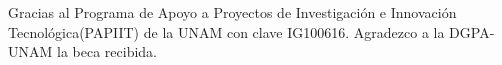 
\begin{acknowledgements}
Gracias al Programa de Apoyo a Proyectos de Investigación e Innovación Tecnológica(PAPIIT) de la UNAM con clave IG100616. Agradezco a la DGPA-UNAM la beca recibida.
\end{acknowledgements}




